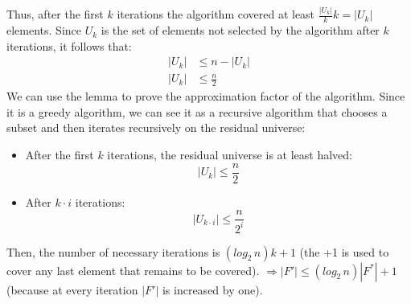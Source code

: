 Thus, after the first $k$ iterations the algorithm covered at least $\frac{|U_k|}{k}k = |U_k|$ elements. Since $U_k$ is the set of elements not selected by the algorithm after $k$ iterations, it follows that:
\begin{equation}
    \begin{split}
       |U_k| & \leq n - |U_k|\\
       |U_k| & \leq \frac{n}{2}
    \end{split}
\end{equation}
We can use the lemma to prove the approximation factor of the algorithm. Since it is a greedy algorithm, we can see it as a recursive algorithm that chooses a subset and then iterates recursively on the residual universe:
\begin{itemize}
    \item After the first $k$ iterations, the residual universe is at least halved:
    \[|U_k| \leq \frac{n}{2}\]

    \item After $k \cdot i$ iterations:
    \[|U_{k \cdot i}| \leq \frac{n}{2^i}\]
\end{itemize}
Then, the number of necessary iterations is $(log_2\,n)k + 1 $ (the +1 is used to cover any last element that remains to be covered).\newline\newline
$\Rightarrow |F'| \leq (log_2\,n)|F^*| + 1$ (because at every iteration $|F'|$ is increased by one).


